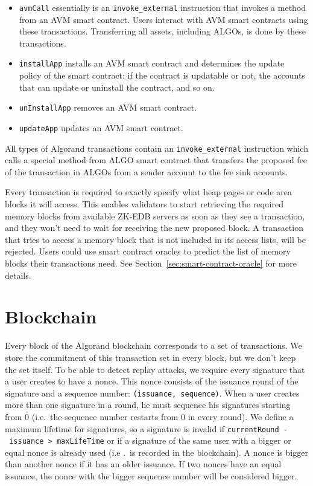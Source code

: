 \documentclass[11pt, A4]{report}
\begin{document}
    \begin{itemize}
        \item \texttt{avmCall} essentially is an \texttt{invoke\_external} instruction that invokes a method from an
        AVM smart contract. Users interact with AVM smart contracts using these transactions. Transferring all
        assets, including ALGOs, is done by these transactions.
        \item \texttt{installApp} installs an AVM smart contract and determines the update policy of the smart
        contract: if the contract is updatable or not, the accounts that can update or uninstall the contract, and so
        on.
        \item \texttt{unInstallApp} removes an AVM smart contract.
        \item \texttt{updateApp} updates an AVM smart contract.
    \end{itemize}

    All types of Algorand transactions contain an \texttt{invoke\_external} instruction which calls a special method
    from ALGO smart contract that transfers the proposed fee of the transaction in ALGOs from a sender account to the
    fee sink accounts.

    Every transaction is required to exactly specify what heap pages or code area blocks it will access. This enables
    validators to start retrieving the required memory blocks from available ZK-EDB servers as soon as they see a
    transaction, and they won't need to wait for receiving the new proposed block. A transaction that tries to access
    a memory block that is not included in its access lists, will be rejected. Users could
    use smart contract oracles to predict the list of memory blocks their transactions need. See
    Section~\ref{sec:smart-contract-oracle} for more details.


    \section{Blockchain}\label{sec:blockchain}

    Every block of the Algorand blockchain corresponds to a set of transactions. We store the commitment of this
    transaction set in every block, but we don't keep the set itself. To be able to detect replay attacks, we require
    every signature that a user creates to have a nonce. This nonce consists of the issuance round of the signature
    and a sequence number: \texttt{(issuance,\ sequence)}. When a user creates more than one signature in a round, he
    must sequence his signatures starting from 0 (i.e.~the sequence number restarts from 0 in every round). We define
    a maximum lifetime for signatures, so a signature is invalid if \texttt{currentRound\ -\ issuance\
        \textgreater{}\ maxLifeTime} or if a signature of the same user with a bigger or equal nonce is already used
    (i.e
    .~is recorded in the blockchain). A nonce is bigger than another nonce if it has an older issuance. If two nonces
    have an equal issuance, the nonce with the bigger sequence number will be considered bigger.
\end{document}

